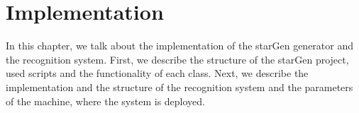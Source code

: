 \chapter{Implementation} \label{chap:implementation}

In this chapter, we talk about the implementation of the starGen generator and the recognition system. First, we describe the structure of the starGen project, used scripts and the functionality of each class. Next, we describe the implementation and the structure of the recognition system and the parameters of the machine, where the system is deployed. 



